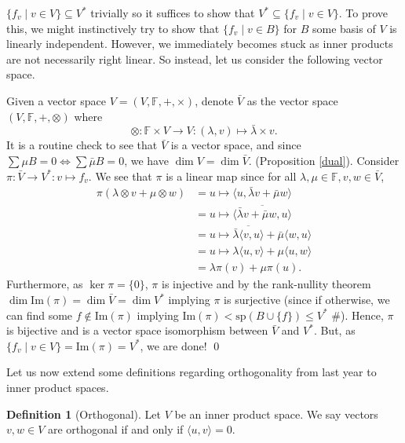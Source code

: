 \documentclass[
]{article}
\theoremstyle{definition}
\theoremstyle{definition}
\newtheorem{definition}{Definition}[section]
\begin{document}
\(\{f_v \mid v \in V\} \subseteq V^*\) trivially so it suffices to show
that \(V^* \subseteq \{f_v \mid v \in V\}\). To prove this, we might
instinctively try to show that \(\{f_v \mid v \in B\}\) for \(B\) some
basis of \(V\) is linearly independent. However, we immediately becomes
stuck as inner products are not necessarily right linear. So instead,
let us consider the following vector space.

Given a vector space \(V = (V, \mathbb{F}, +, \times)\), denote
\(\bar{V}\) as the vector space \((V, \mathbb{F}, +, \otimes)\) where
\[\otimes : \mathbb{F} \times V \to V : (\lambda, v) \mapsto \bar{\lambda} \times v.\]
It is a routine check to see that \(\bar{V}\) is a vector space, and
since \(\sum\mu B = 0 \iff \sum \bar{\mu} B = 0\), we have
\(\dim V = \dim \bar{V}\). \proof (Proposition \ref{dual}). Consider
\(\pi : \bar{V} \to V^* : v \mapsto f_v\). We see that \(\pi\) is a
linear map since for all
\(\lambda, \mu \in \mathbb{F}, v, w \in \bar{V}\), \begin{align*}
    \pi(\lambda \otimes v + \mu \otimes  w) & = 
      u \mapsto \langle u, \bar{\lambda} v + \bar{\mu} w \rangle \\
      & = u \mapsto \overline{\langle \bar{\lambda} v + \bar{\mu} w, u \rangle} \\
      & = u \mapsto \overline{\bar{\lambda} \langle v, u \rangle} + \bar{\mu} 
        \langle w, u \rangle \\
      & = u \mapsto \lambda \langle u, v \rangle + \mu \langle u, w \rangle \\
      & = \lambda \pi(v) + \mu \pi(u).
  \end{align*} Furthermore, as \(\ker \pi = \{0\}\), \(\pi\) is
injective and by the rank-nullity theorem
\(\dim \mathrm{Im}(\pi) = \dim \bar{V} = \dim V^*\) implying \(\pi\) is
surjective (since if otherwise, we can find some
\(f \not\in \text{Im}(\pi)\) implying
\(\text{Im}(\pi) < \text{sp}(B \cup \{f\}) \le V^*\) \#). Hence, \(\pi\)
is bijective and is a vector space isomorphism between \(\bar{V}\) and
\(V^*\). But, as \(\{f_v \mid v \in V\} = \text{Im}(\pi) = V^*\), we are
done! \qed

Let us now extend some definitions regarding orthogonality from last
year to inner product spaces.

\begin{definition}[Orthogonal]
  Let \(V\) be an inner product space. We say vectors \(v, w \in V\) are 
  orthogonal if and only if \(\langle u, v \rangle = 0\).
\end{definition}
\end{document}
